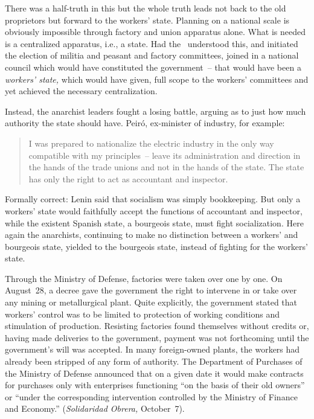 \medskip

There was a half-truth in this but the whole truth leads not back to the old proprietors but forward to the workers’ state. Planning on a national scale is obviously impossible through factory and union apparatus alone. What is needed is a centralized apparatus, i.e., a state. Had the \CNT\ understood this, and initiated the election of militia and peasant and factory committees, joined in a national council which would have constituted the government~-- that would have been a \emph{workers’ state,} which would have given, full scope to the workers’ committees and yet achieved the necessary centralization.

Instead, the anarchist leaders fought a losing battle, arguing as to just how much authority the state should have. Peir\'o, ex-minister of industry, for example:

\begin{quotation}
  I was prepared to nationalize the electric industry in the only way compatible with my principles~-- leave its administration and direction in the hands of the trade unions and not in the hands of the state. The state has only the right to act as accountant and inspector.
\end{quotation}

Formally correct: Lenin said that socialism was simply bookkeeping. But only a workers’ state would faithfully accept the functions of accountant and inspector, while the existent Spanish state, a bourgeois state, must fight socialization. Here again the anarchists, continuing to make no distinction between a workers’ and bourgeois state, yielded to the bourgeois state, instead of fighting for the workers’ state.

Through the Ministry of Defense, factories were taken over one by one. On August~28, a decree gave the government the right to intervene in or take over any mining or metallurgical plant. Quite explicitly, the government stated that workers’ control was to be limited to protection of working conditions and stimulation of production. Resisting factories found themselves without credits or, having made deliveries to the government, payment was not forthcoming until the government’s will was accepted. In many foreign-owned plants, the workers had already been stripped of any form of authority. The Department of Purchases of the Ministry of Defense announced that on a given date it would make contracts for purchases only with enterprises functioning ``on the basis of their old owners'' or ``under the corresponding intervention controlled by the Ministry of Finance and Economy.'' (\emph{Solidaridad Obrera,} October~7).

